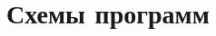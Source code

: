 \documentclass[a4paper,14pt]{report} %
\begin{document}
    
    
    
    
    \section{Схемы программ}
    	\begin{minipage}[t]{1\textwidth}
		\centering{}
		\label{fig4}
	\end{minipage}\hfill
    
\end{document}
